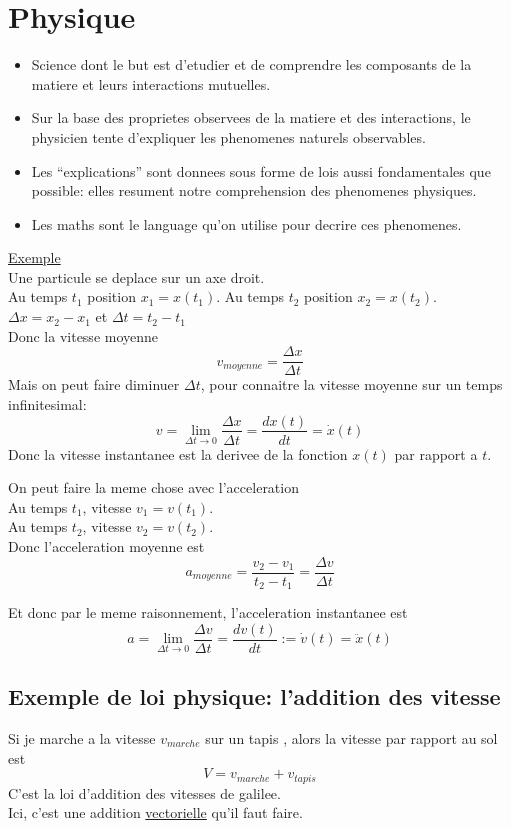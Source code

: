 \documentclass[../main.tex]{subfiles}
\begin{document}
\section{Physique}
\begin{itemize}
	\item Science dont le but est d'etudier et de comprendre les composants de la matiere et leurs interactions mutuelles.\\
	\item Sur la base des proprietes observees de la matiere et des interactions, le physicien tente d'expliquer les phenomenes naturels observables.\\
	\item Les ``explications'' sont donnees sous forme de lois aussi fondamentales que possible: elles resument notre comprehension des phenomenes physiques.\\
	\item Les maths sont le language qu'on utilise pour decrire ces phenomenes.
\end{itemize}
\underline{Exemple}\\
Une particule se deplace sur un axe droit.\\
Au temps $t_1$ position $x_1 = x(t_1)$.
Au temps $t_2$ position $x_2 = x(t_2)$.
$\Delta x = x_2 -x_1$ et $\Delta t = t_2-t_1$\\
Donc la vitesse moyenne 
\[ 
	v_{moyenne} = \frac{\Delta x}{\Delta t}
\]
Mais on peut faire diminuer $\Delta t$, pour connaitre la vitesse moyenne sur un temps infinitesimal:
\[ 
	v = \lim_{\Delta t \to 0} \frac{\Delta x}{\Delta t} = \frac{dx(t)}{dt} = \dot{x}(t)
\]
Donc la vitesse instantanee est la derivee de la fonction $x(t)$ par rapport a $t$.

On peut faire la meme chose avec l'acceleration\\
Au temps $t_1$, vitesse $ v_1 = v(t_1)$.\\
Au temps $t_2$, vitesse $ v_2 = v(t_2)$.\\
Donc l'acceleration moyenne est
\[ 
	a_{moyenne}= \frac{v_2-v_1}{t_2 -t_1} = \frac{\Delta v}{\Delta t}
\]

Et donc par le meme raisonnement, l'acceleration instantanee est
\[ 
	a = \lim_{\Delta t \to 0} \frac{\Delta v}{\Delta t} = \frac{dv(t)}{dt} := \dot{v}(t) = \ddot{x}(t)
\]

\subsection{Exemple de loi physique: l'addition des vitesse}
Si je marche a la vitesse $v_{marche}$ sur un tapis , alors la vitesse par rapport au sol est
\[ 
	V = v_{marche} + v_{tapis}
\]
C'est la loi d'addition des vitesses de galilee.\\
Ici, c'est une addition \underline{vectorielle} qu'il faut faire.\\
\end{document}
